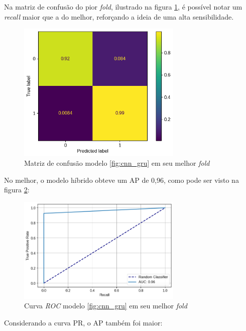 \documentclass[
    12pt,                %
    openright,           %
    oneside,             %
    a4paper,             %
    brazil               %
]{abntex2}
\begin{document}
Na matriz de confusão do pior \textit{fold}, ilustrado na figura \ref{fig:matriz_confusao_cnn_gru_pior_fold}, é possível 
notar um \textit{recall} maior que a do melhor, reforçando a ideia de uma alta sensibilidade.

\begin{figure}[H]
  \centering
   \includegraphics[width=0.7\textwidth]{figuras/modelos_resultados/gru_cnn/matriz_confusao_pior_fold_gru_cnn_3.png} 
  \caption{Matriz de confusão modelo \ref{fig:cnn_gru} em seu melhor \textit{fold}}
  \label{fig:matriz_confusao_cnn_gru_pior_fold}
\end{figure}


No melhor, o modelo híbrido obteve um AP de 0,96, como pode ser visto na figura \ref{fig:roc_cnn_gru_melhor_fold}:


\begin{figure}[H]
  \centering
   \includegraphics[width=0.7\textwidth]{figuras/modelos_resultados/gru_cnn/roc_cnn_melhor_fold_1.png} 
  \caption{Curva \textit{ROC} modelo \ref{fig:cnn_gru} em seu melhor \textit{fold}}
  \label{fig:roc_cnn_gru_melhor_fold}
\end{figure}

Considerando a curva PR, o AP também foi maior:
\end{document}
